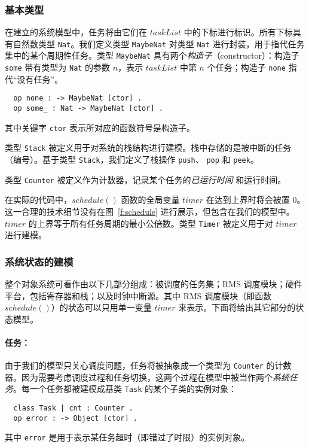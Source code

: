\subsubsection{基本类型}

在建立的系统模型中，任务将由它们在 $\mathit{taskList}$ 中的下标进行标识。所有下标具有自然数类型 \verb|Nat|。我们定义类型 \verb|MaybeNat| 对类型 \verb|Nat| 进行封装，用于指代任务集中的某个周期性任务。类型 \verb|MaybeNat| 具有两个\emph{构造子}（constructor）：构造子 \verb|some| 带有类型为 \verb|Nat| 的参数 $n$，表示 $\mathit{taskList}$ 中第 $n$ 个任务；构造子 \verb|none| 指代“没有任务”。
\begin{verbatim}
  op none : -> MaybeNat [ctor] .
  op some_ : Nat -> MaybeNat [ctor] .
\end{verbatim}
其中关键字 \verb|ctor| 表示所对应的函数符号是构造子。

类型 \verb|Stack| 被定义用于对系统的栈结构进行建模。栈中存储的是被中断的任务（编号）。基于类型 \verb|Stack|，我们定义了栈操作 \verb|push|、 \verb|pop| 和 \verb|peek|。

类型 \verb|Counter| 被定义作为计数器，记录某个任务的\emph{已运行时间} 和运行时间。

在实际的代码中，$\mathit{schedule()}$ 函数的全局变量 $\mathit{timer}$ 在达到上界时将会被置 0。这一合理的技术细节没有在图~\ref{f:schedule} 进行展示，但包含在我们的模型中。$\mathit{timer}$ 的上界等于所有任务周期的最小公倍数。类型 \verb|Timer| 被定义用于对 $\mathit{timer}$ 进行建模。

\subsubsection{系统状态的建模}

整个对象系统可看作由以下几部分组成：被调度的任务集；RMS 调度模块；硬件平台，包括寄存器和栈；以及时钟中断源。其中 RMS 调度模块（即函数 $\mathit{schedule()}$）的状态可以只用单一变量 $\mathit{timer}$ 来表示。下面将给出其它部分的状态模型。

\paragraph{任务：} 由于我们的模型只关心调度问题，任务将被抽象成一个类型为 \verb|Counter| 的计数器。因为需要考虑调度过程和任务切换，这两个过程在模型中被当作两个\emph{系统任务}。每一个任务都被建模成基类 \verb|Task| 的某个子类的实例对象：
\begin{verbatim}
  class Task | cnt : Counter .
  op error : -> Object [ctor] .
\end{verbatim}
其中 \verb|error| 是用于表示某任务超时（即错过了时限）的实例对象。

